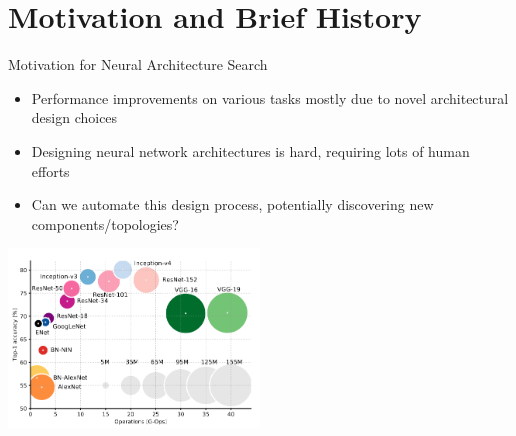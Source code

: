 \section{Motivation and Brief History}
\begin{frame}[c]{Motivation for Neural Architecture Search}

\centering
\begin{itemize}
  \item Performance improvements on various tasks mostly due to novel architectural design choices
  \item Designing neural network architectures is hard, requiring lots of human efforts
  \item Can we automate this design process, potentially discovering new components/topologies?
\end{itemize}
	
\includegraphics[width=0.5\textwidth]{images_lec7/architectures_perf.png}\\

\end{frame}
